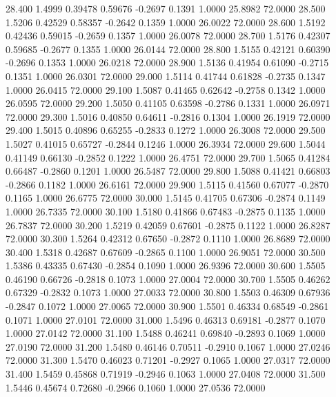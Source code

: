   28.400   1.4999   0.39478   0.59676  -0.2697   0.1391   1.0000  25.8982  72.0000
  28.500   1.5206   0.42529   0.58357  -0.2642   0.1359   1.0000  26.0022  72.0000
  28.600   1.5192   0.42436   0.59015  -0.2659   0.1357   1.0000  26.0078  72.0000
  28.700   1.5176   0.42307   0.59685  -0.2677   0.1355   1.0000  26.0144  72.0000
  28.800   1.5155   0.42121   0.60390  -0.2696   0.1353   1.0000  26.0218  72.0000
  28.900   1.5136   0.41954   0.61090  -0.2715   0.1351   1.0000  26.0301  72.0000
  29.000   1.5114   0.41744   0.61828  -0.2735   0.1347   1.0000  26.0415  72.0000
  29.100   1.5087   0.41465   0.62642  -0.2758   0.1342   1.0000  26.0595  72.0000
  29.200   1.5050   0.41105   0.63598  -0.2786   0.1331   1.0000  26.0971  72.0000
  29.300   1.5016   0.40850   0.64611  -0.2816   0.1304   1.0000  26.1919  72.0000
  29.400   1.5015   0.40896   0.65255  -0.2833   0.1272   1.0000  26.3008  72.0000
  29.500   1.5027   0.41015   0.65727  -0.2844   0.1246   1.0000  26.3934  72.0000
  29.600   1.5044   0.41149   0.66130  -0.2852   0.1222   1.0000  26.4751  72.0000
  29.700   1.5065   0.41284   0.66487  -0.2860   0.1201   1.0000  26.5487  72.0000
  29.800   1.5088   0.41421   0.66803  -0.2866   0.1182   1.0000  26.6161  72.0000
  29.900   1.5115   0.41560   0.67077  -0.2870   0.1165   1.0000  26.6775  72.0000
  30.000   1.5145   0.41705   0.67306  -0.2874   0.1149   1.0000  26.7335  72.0000
  30.100   1.5180   0.41866   0.67483  -0.2875   0.1135   1.0000  26.7837  72.0000
  30.200   1.5219   0.42059   0.67601  -0.2875   0.1122   1.0000  26.8287  72.0000
  30.300   1.5264   0.42312   0.67650  -0.2872   0.1110   1.0000  26.8689  72.0000
  30.400   1.5318   0.42687   0.67609  -0.2865   0.1100   1.0000  26.9051  72.0000
  30.500   1.5386   0.43335   0.67430  -0.2854   0.1090   1.0000  26.9396  72.0000
  30.600   1.5505   0.46190   0.66726  -0.2818   0.1073   1.0000  27.0004  72.0000
  30.700   1.5505   0.46262   0.67329  -0.2832   0.1073   1.0000  27.0033  72.0000
  30.800   1.5503   0.46309   0.67936  -0.2847   0.1072   1.0000  27.0065  72.0000
  30.900   1.5501   0.46334   0.68549  -0.2861   0.1071   1.0000  27.0101  72.0000
  31.000   1.5496   0.46313   0.69181  -0.2877   0.1070   1.0000  27.0142  72.0000
  31.100   1.5488   0.46241   0.69840  -0.2893   0.1069   1.0000  27.0190  72.0000
  31.200   1.5480   0.46146   0.70511  -0.2910   0.1067   1.0000  27.0246  72.0000
  31.300   1.5470   0.46023   0.71201  -0.2927   0.1065   1.0000  27.0317  72.0000
  31.400   1.5459   0.45868   0.71919  -0.2946   0.1063   1.0000  27.0408  72.0000
  31.500   1.5446   0.45674   0.72680  -0.2966   0.1060   1.0000  27.0536  72.0000
